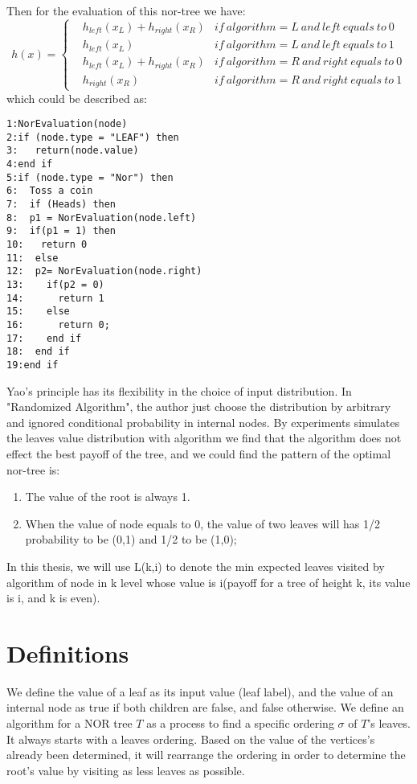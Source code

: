 Then for the evaluation of this nor-tree we have:
$$ h(x)=\left\{
\begin{aligned}
&h_{left}(x_L) + h_{right}(x_R) & if\ algorithm=L\ and\ left\ equals\ to\ 0\\
&h_{left}(x_L)  & if\ algorithm=L\ and\  left\ equals\ to\ 1\\
&h_{left}(x_L) + h_{right}(x_R) & if\ algorithm=R\ and\ right\ equals\ to\ 0\\
&h_{right}(x_R) & if\ algorithm=R\ and\ right\ equals\ to\ 1
\end{aligned}
\right.
$$
which could be described as:
\begin{lstlisting}[title=evaluation of nor-tree, frame=shadowboc]
1:NorEvaluation(node)
2:if (node.type = "LEAF") then
3:   return(node.value)
4:end if
5:if (node.type = "Nor") then
6:  Toss a coin
7:  if (Heads) then
8:  p1 = NorEvaluation(node.left)
9:  if(p1 = 1) then 
10:   return 0
11:  else
12:  p2= NorEvaluation(node.right) 	
13:    if(p2 = 0)
14:      return 1
15:    else
16:      return 0;
17:    end if
18:  end if
19:end if
\end{lstlisting}
Yao's principle has its flexibility in the choice of input distribution. In "Randomized Algorithm", the author just choose the distribution by arbitrary and ignored conditional probability in internal nodes. By experiments simulates the leaves value distribution with algorithm we find that the algorithm does not effect the best payoff of the tree, and we could find the pattern of the optimal nor-tree is:
\begin{enumerate}
	\item The value of the root is always 1.
	\item When the value of node equals to 0, the value of two leaves will has 1/2 probability to be (0,1) and 1/2 to be (1,0);
\end{enumerate}

In this thesis, we will use L(k,i) to denote the min expected leaves visited by algorithm of node 
in k level whose value is i(payoff for a tree of height k, its value is i, and k is even).

\section{Definitions}
We define the value of a leaf as its input value (leaf label), and 
the value of an internal node as true if both children are false,
and false otherwise.
We define
 an algorithm for a NOR tree $T$ as a process to find a specific ordering $\sigma$ of 
$T$'s leaves. It always starts with a leaves ordering. Based on the value of the vertices's already been determined, it will rearrange the ordering in order to determine the root's value by visiting as less leaves as possible. 

